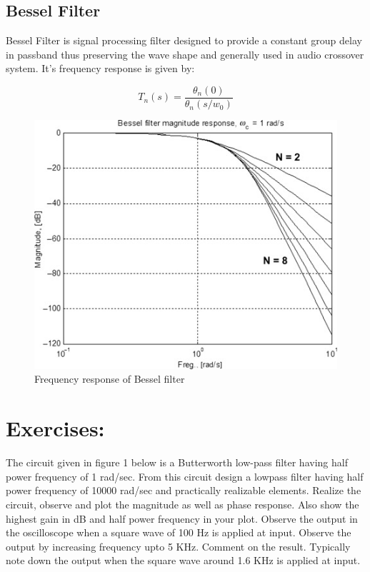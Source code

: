 \documentclass[a4paper,11pt]{article}
\begin{document}
\subsection{Bessel Filter}
Bessel Filter is signal processing filter designed to provide a constant group delay in passband thus preserving the wave shape and generally used in audio crossover system. It's frequency response is given by:

\begin{equation*}
    T_n(s)=\frac{\theta_n(0)}{\theta_n(s/w_0)}
\end{equation*}

\begin{figure}[H]
    \centering
    \includegraphics[width=0.5\linewidth]{./FIG/bessel.jpg}
    \caption{Frequency response of Bessel filter}
\end{figure}







\pagebreak


\section{Exercises:}


\begin{Q}
    {
        The circuit given in figure 1 below is a Butterworth low-pass filter having half power frequency of
        1 rad/sec. From this circuit design a lowpass filter having half power frequency of 10000 rad/sec
        and practically realizable elements. Realize the circuit, observe and plot the magnitude as well as
        phase response. Also show the highest gain in dB and half power frequency in your plot.\newline
        Observe the output in the oscilloscope when a square wave of 100 Hz is applied at input. Observe the output by increasing frequency upto 5 KHz. Comment on the result.\newline
        Typically note down the output when the square wave around 1.6 KHz is applied at input.
    }
\end{Q}
\end{document}
